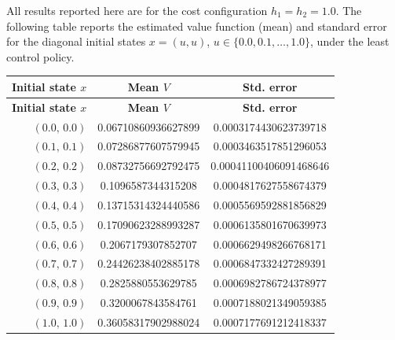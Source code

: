 \documentclass[11pt]{article}
\theoremstyle{definition}
\theoremstyle{plain}
\begin{document}
\begin{appendices}
All results reported here are for the cost configuration $h_1 = h_2 = 1.0$.
The following table reports the estimated value function (mean) and standard error for the diagonal initial states $x=(u,u)$, $u\in\{0.0,0.1,\dots,1.0\}$, under the least control policy.
\begin{longtable}{@{}rcc@{}}
\toprule
\textbf{Initial state $x$} & \textbf{Mean $V$} & \textbf{Std. error} \\
\midrule
\endfirsthead
\toprule
\textbf{Initial state $x$} & \textbf{Mean $V$} & \textbf{Std. error} \\
\midrule
\endhead
$(0.0,\,0.0)$ & 0.06710860936627899 & 0.0003174430623739718 \\
$(0.1,\,0.1)$ & 0.07286877607579945 & 0.0003463517851296053 \\
$(0.2,\,0.2)$ & 0.08732756692792475 & 0.00041100406091468646 \\
$(0.3,\,0.3)$ & 0.1096587344315208 & 0.0004817627558674379 \\
$(0.4,\,0.4)$ & 0.13715314324440586 & 0.0005569592881856829 \\
$(0.5,\,0.5)$ & 0.17090623288993287 & 0.0006135801670639973 \\
$(0.6,\,0.6)$ & 0.2067179307852707 & 0.0006629498266768171 \\
$(0.7,\,0.7)$ & 0.24426238402885178 & 0.0006847332427289391 \\
$(0.8,\,0.8)$ & 0.2825880553629785 & 0.0006982786724378977 \\
$(0.9,\,0.9)$ & 0.3200067843584761 & 0.0007188021349059385 \\
$(1.0,\,1.0)$ & 0.36058317902988024 & 0.0007177691212418337 \\
\bottomrule
\end{longtable}

\iffalse

\end{appendices}
\end{document}

